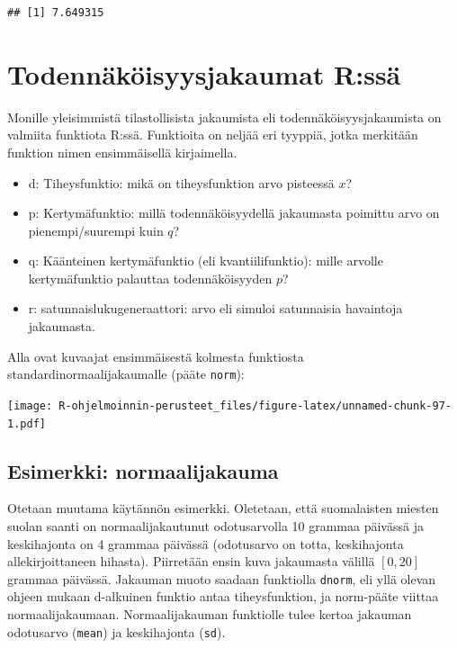 \documentclass[
]{book}
\providecommand{\tightlist}{%
  \setlength{\itemsep}{0pt}\setlength{\parskip}{0pt}}
\begin{document}
\begin{verbatim}
## [1] 7.649315
\end{verbatim}

\hypertarget{distributions}{%
\chapter{Todennäköisyysjakaumat R:ssä}\label{distributions}}

Monille yleisimmistä tilastollisista jakaumista eli todennäköisyysjakaumista on valmiita funktiota R:ssä. Funktioita on neljää eri tyyppiä, jotka merkitään funktion nimen ensimmäisellä kirjaimella.

\begin{itemize}
\tightlist
\item
  d: Tiheysfunktio: mikä on tiheysfunktion arvo pisteessä \(x\)?
\item
  p: Kertymäfunktio: millä todennäköisyydellä jakaumasta poimittu arvo on pienempi/suurempi kuin \(q\)?
\item
  q: Käänteinen kertymäfunktio (eli kvantiilifunktio): mille arvolle kertymäfunktio palauttaa todennäköisyyden \(p\)?
\item
  r: satunnaislukugeneraattori: arvo eli simuloi satunnaisia havaintoja jakaumasta.
\end{itemize}

Alla ovat kuvaajat ensimmäisestä kolmesta funktiosta standardinormaalijakaumalle (pääte \texttt{norm}):

\texttt{[image: R-ohjelmoinnin-perusteet\_files/figure-latex/unnamed-chunk-97-1.pdf]}

\hypertarget{esimerkki-normaalijakauma}{%
\section{Esimerkki: normaalijakauma}\label{esimerkki-normaalijakauma}}

Otetaan muutama käytännön esimerkki. Oletetaan, että suomalaisten miesten suolan saanti on normaalijakautunut odotusarvolla 10 grammaa päivässä ja keskihajonta on 4 grammaa päivässä (odotusarvo on totta, keskihajonta allekirjoittaneen hihasta). Piirretään ensin kuva jakaumasta välillä \([0, 20]\) grammaa päivässä. Jakauman muoto saadaan funktiolla \texttt{dnorm}, eli yllä olevan ohjeen mukaan d-alkuinen funktio antaa tiheysfunktion, ja norm-pääte viittaa normaalijakaumaan. Normaalijakauman funktiolle tulee kertoa jakauman odotusarvo (\texttt{mean}) ja keskihajonta (\texttt{sd}).
\end{document}
